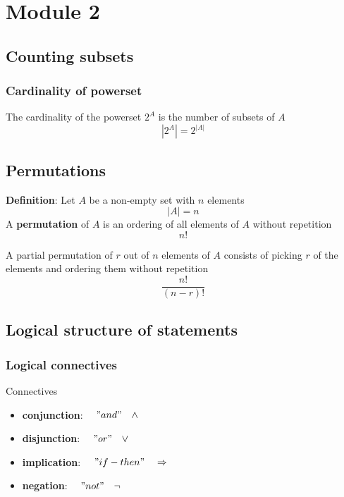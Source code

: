 \chapter{Module 2}

\section{Counting subsets}

\subsection{Cardinality of powerset}
The cardinality of the powerset $2^A$ is the number of subsets of  $A$
\[
   |2^A| = 2^{|A|}
\] 


\section{Permutations}

\begin{framed}
   \textbf{Definition}: Let  $A$ be a non-empty set with $n$ elements 
   \[
     |A| = n
   \] 
   A \textbf{permutation} of $A$ is an ordering of all elements of $A$ without repetition \\
   \[
     n!
   \] 

   A partial permutation of $r$ out of $n$ elements of $A$ consists of picking $r$ of the elements and ordering them without repetition
   \[
     \frac{n!}{(n -r)!}
   \] 
\end{framed}

\section{Logical structure of statements}

\subsection{Logical connectives}
\begin{framed}
   Connectives
\begin{itemize}
   \item \textbf{conjunction}:  $\quad "and" \quad \land$
   \item \textbf{disjunction}:  $\quad "or" \quad \lor$
   \item \textbf{implication}:  $\quad "if-then" \quad \Rightarrow$
   \item \textbf{negation}:  $\quad "not" \quad \lnot$
\end{itemize}
\end{framed}

